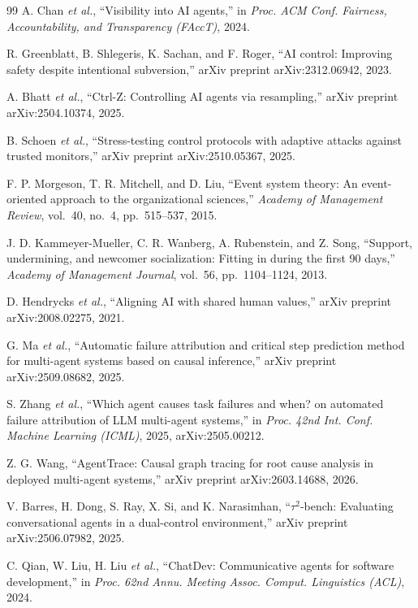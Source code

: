 \documentclass[conference]{IEEEtran}
\begin{document}
\begin{thebibliography}{99}
A. Chan \emph{et al.}, ``Visibility into AI agents,'' in \emph{Proc. ACM Conf.
Fairness, Accountability, and Transparency (FAccT)}, 2024.

R. Greenblatt, B. Shlegeris, K. Sachan, and F. Roger, ``AI control: Improving
safety despite intentional subversion,'' arXiv preprint arXiv:2312.06942, 2023.

A. Bhatt \emph{et al.}, ``Ctrl-Z: Controlling AI agents via resampling,'' arXiv
preprint arXiv:2504.10374, 2025.

B. Schoen \emph{et al.}, ``Stress-testing control protocols with adaptive
attacks against trusted monitors,'' arXiv preprint arXiv:2510.05367, 2025.

F. P. Morgeson, T. R. Mitchell, and D. Liu, ``Event system theory: An
event-oriented approach to the organizational sciences,'' \emph{Academy of
Management Review}, vol.~40, no.~4, pp.~515--537, 2015.

J. D. Kammeyer-Mueller, C. R. Wanberg, A. Rubenstein, and Z. Song, ``Support,
undermining, and newcomer socialization: Fitting in during the first 90 days,''
\emph{Academy of Management Journal}, vol.~56, pp.~1104--1124, 2013.

D. Hendrycks \emph{et al.}, ``Aligning AI with shared human values,'' arXiv
preprint arXiv:2008.02275, 2021.

G. Ma \emph{et al.}, ``Automatic failure attribution and critical step
prediction method for multi-agent systems based on causal inference,'' arXiv
preprint arXiv:2509.08682, 2025.

S. Zhang \emph{et al.}, ``Which agent causes task failures and when? on
automated failure attribution of LLM multi-agent systems,'' in \emph{Proc. 42nd
Int. Conf. Machine Learning (ICML)}, 2025, arXiv:2505.00212.

Z. G. Wang, ``AgentTrace: Causal graph tracing for root cause analysis in
deployed multi-agent systems,'' arXiv preprint arXiv:2603.14688, 2026.

V. Barres, H. Dong, S. Ray, X. Si, and K. Narasimhan, ``$\tau^2$-bench:
Evaluating conversational agents in a dual-control environment,'' arXiv
preprint arXiv:2506.07982, 2025.

C. Qian, W. Liu, H. Liu \emph{et al.}, ``ChatDev: Communicative agents for
software development,'' in \emph{Proc. 62nd Annu. Meeting Assoc. Comput.
Linguistics (ACL)}, 2024.


\end{thebibliography}
\end{document}
